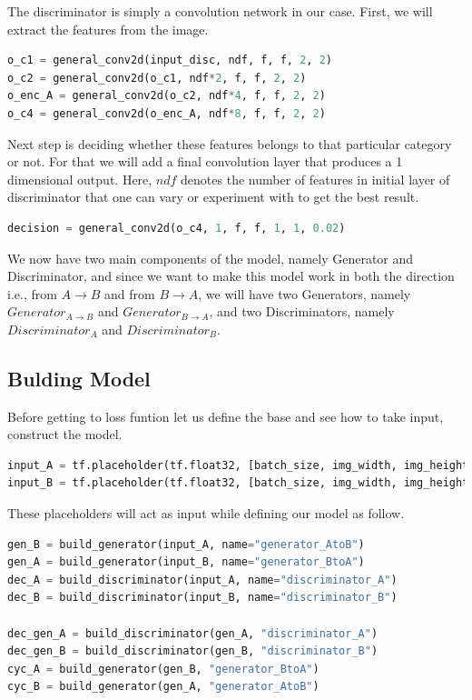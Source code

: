 \documentclass[peerreview]{IEEEtran}
\begin{document}
The discriminator is simply a convolution network in our case. First, we will extract the features from the image.

\begin{lstlisting}[language=Python]
o_c1 = general_conv2d(input_disc, ndf, f, f, 2, 2)
o_c2 = general_conv2d(o_c1, ndf*2, f, f, 2, 2)
o_enc_A = general_conv2d(o_c2, ndf*4, f, f, 2, 2)
o_c4 = general_conv2d(o_enc_A, ndf*8, f, f, 2, 2)
\end{lstlisting}

Next step is deciding whether these features belongs to that particular category or not. For that we will add a final convolution layer that produces a 1 dimensional output. Here, $ndf$ denotes the number of features in initial layer of discriminator that one can vary or experiment with to get the best result.

\begin{lstlisting}[language=Python]
decision = general_conv2d(o_c4, 1, f, f, 1, 1, 0.02)
\end{lstlisting}

We now have two main components of the model, namely Generator and Discriminator, and since we want to make this model work in both the direction i.e., from $A \to B$ and from $B \to A$, we will have two Generators, namely $Generator_{A \to B}$ and $Generator_{B \to A}$, and two Discriminators, namely $Discriminator_A$ and $Discriminator_B$.

\subsection{Bulding Model}
Before getting to loss funtion let us define the base and see how to take input, construct the model.

\begin{lstlisting}[language=Python]
input_A = tf.placeholder(tf.float32, [batch_size, img_width, img_height, img_layer], name="input_A")
input_B = tf.placeholder(tf.float32, [batch_size, img_width, img_height, img_layer], name="input_B")
\end{lstlisting}

These placeholders will act as input while defining our model as follow.

\begin{lstlisting}[language=Python]
gen_B = build_generator(input_A, name="generator_AtoB")
gen_A = build_generator(input_B, name="generator_BtoA")
dec_A = build_discriminator(input_A, name="discriminator_A")
dec_B = build_discriminator(input_B, name="discriminator_B")

dec_gen_A = build_discriminator(gen_A, "discriminator_A")
dec_gen_B = build_discriminator(gen_B, "discriminator_B")
cyc_A = build_generator(gen_B, "generator_BtoA")
cyc_B = build_generator(gen_A, "generator_AtoB")
\end{lstlisting}
\end{document}
